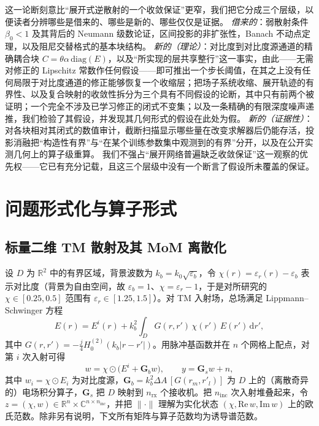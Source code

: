 \documentclass[UTF8,a4paper,11pt]{ctexart}
\newcommand{\R}{\mathbb{R}}
\newcommand{\C}{\mathbb{C}}
\newcommand{\norm}[1]{\lVert #1 \rVert}
\begin{document}
这一论断刻意比“展开式逆散射的一个收敛保证”更窄，我们把它分成三个层级，以便读者分辨哪些是借来的、哪些是新的、哪些仅仅是证据。
\emph{借来的}：弱散射条件 $\beta_0<1$ 及其背后的 Neumann 级数论证，区间投影的非扩张性，Banach 不动点定理，以及阻尼交替格式的基本块结构。
\emph{新的（理论）}：对比度到对比度源通道的精确耦合块 $C=\theta\alpha\,\mathrm{diag}(E)$，以及“所实现的层共享整行”这一事实，由此——无需对修正的 Lipschitz 常数作任何假设——即可推出一个步长阈值，在其之上没有任何局限于对比度通道的修正能够恢复一个收缩层；把场子系统收缩、展开轨迹的有界性、以及复合映射的收敛性拆分为三个具有不同假设的论断，其中只有前两个被证明；一个完全不涉及已学习修正的闭式不变集；以及一条精确的有限深度噪声递推，我们检验了其假设，并发现其几何形式的假设在此处为假。
\emph{新的（证据性）}：对各块相对其闭式的数值审计，截断扫描显示哪些量在改变求解器后仍能存活，投影消融把“构造性有界”与“在某个训练参数集中观测到的有界”分开，以及在公开实测几何上的算子级重算。
我们不强占“展开网络普遍缺乏收敛保证”这一观察的优先权——它已有充分记载，且这三个层级中没有一个断言了假设所未覆盖的保证。

\section{问题形式化与算子形式}\label{sec:form}
\subsection{标量二维 TM 散射及其 MoM 离散化}
设 $D$ 为 $\R^2$ 中的有界区域，背景波数为 $k_b=k_0\sqrt{\varepsilon_b}$，令 $\chi(r)=\varepsilon_r(r)-\varepsilon_b$ 表示对比度（背景为自由空间，故 $\varepsilon_b=1$、$\chi=\varepsilon_r-1$，于是对所研究的 $\chi\in[0.25,0.5]$ 范围有 $\varepsilon_r\in[1.25,1.5]$）。对 TM 入射场，总场满足 Lippmann--Schwinger 方程
\begin{equation}\label{eq:ls}
E(r) = E^{i}(r) + k_b^2\!\int_D G(r,r')\,\chi(r')\,E(r')\,\mathrm{d}r',
\end{equation}
其中 $G(r,r')=-\tfrac{j}{4}H_0^{(2)}(k_b|r-r'|)$。用脉冲基函数并在 $n$ 个网格上配点，对第 $i$ 次入射可得
\begin{equation}\label{eq:discrete}
w = \chi\odot\big(E^i + \mathbf{G}_b w\big),\qquad
y = \mathbf{G}_s w + n,
\end{equation}
其中 $w_i=\chi\odot E_i$ 为对比度源，$\mathbf{G}_b=k_b^2\Delta A\,
[G(r_m,r'_l)]$ 为 $D$ 上的（离散奇异的）电场积分算子，$\mathbf{G}_s$ 把 $D$ 映射到 $n_{\mathrm{rx}}$ 个接收机。把 $n_{\mathrm{inc}}$ 次入射堆叠起来，令 $z=(\chi,w)\in\R^n\times\C^{n\times n_{\mathrm{inc}}}$，并把 $\norm{\cdot}$ 理解为实化状态
$(\chi,\mathrm{Re}\,w,\mathrm{Im}\,w)$ 上的欧氏范数。除非另有说明，下文所有矩阵与算子范数均为诱导谱范数。
\end{document}
